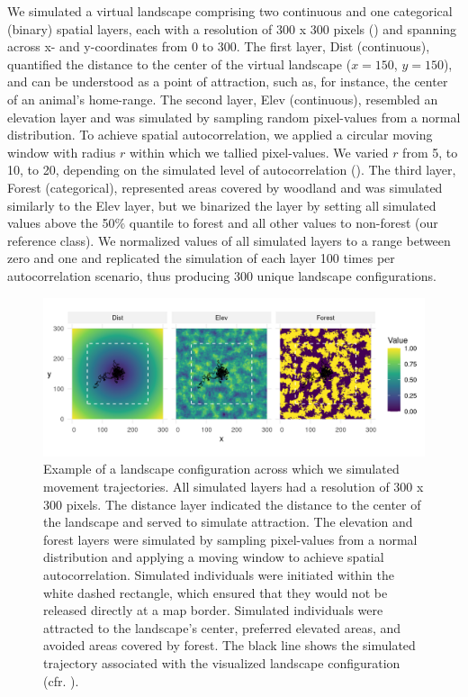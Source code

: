\documentclass[../FinalThesis.tex]{subfiles}
\begin{document}
We simulated a virtual landscape comprising two continuous and one categorical
(binary) spatial layers, each with a resolution of 300 x 300 pixels
() and spanning across x- and y-coordinates from 0 to 300. The
first layer, \textsf{Dist} (continuous), quantified the distance to the center
of the virtual landscape ($x = 150$, $y = 150$), and can be understood as a
point of attraction, such as, for instance, the center of an animal's
home-range. The second layer, \textsf{Elev} (continuous), resembled an elevation
layer and was simulated by sampling random pixel-values from a normal
distribution. To achieve spatial autocorrelation, we applied a circular moving
window with radius $r$ within which we tallied pixel-values. We varied $r$ from
5, to 10, to 20, depending on the simulated level of autocorrelation
(). The third layer, \textsf{Forest} (categorical),
represented areas covered by woodland and was simulated similarly to the
\textsf{Elev} layer, but we binarized the layer by setting all simulated values
above the 50\% quantile to forest and all other values to non-forest (our
reference class). We normalized values of all simulated layers to a range
between zero and one and replicated the simulation of each layer 100 times per
autocorrelation scenario, thus producing 300 unique landscape configurations.

\begin{figure}[htpb]
  \begin{center}
  \includegraphics[width = \textwidth]{Figures/Covariates.png}
  \caption{Example of a landscape configuration across which we simulated
  movement trajectories. All simulated layers had a resolution of 300 x 300
  pixels. The distance layer indicated the distance to the center of the
  landscape and served to simulate attraction. The elevation and forest layers
  were simulated by sampling pixel-values from a normal distribution and
  applying a moving window to achieve spatial autocorrelation. Simulated
  individuals were initiated within the white dashed rectangle, which ensured
  that they would not be released directly at a map border. Simulated
  individuals were attracted to the landscape's center, preferred elevated
  areas, and avoided areas covered by forest. The black line shows the simulated
  trajectory associated with the visualized landscape configuration (cfr.
  ).}
  \label{Covariates}
  \end{center}
\end{figure}
\end{document}

